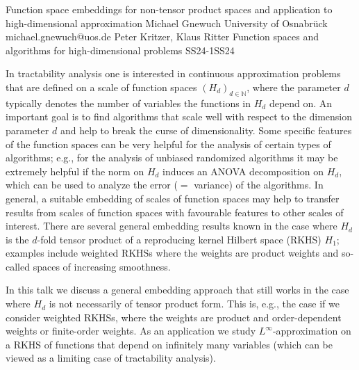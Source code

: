\begin{talk}
  {Function space embeddings for non-tensor product spaces and application to high-dimensional approximation}%
  {Michael Gnewuch}%
  {University of Osnabr\"uck}%
  {michael.gnewuch@uos.de}%
  {Peter Kritzer, Klaus Ritter}%
{Function spaces and algorithms for high-dimensional problems}
{}{SS24-1}{SS24}

			




In tractability analysis one is interested in continuous approximation problems
that are defined on a scale of function spaces $(H_d)_{d\in {\mathbb N}}$, where the parameter
$d$ typically denotes the number of variables the functions in $H_d$ depend on.
An important goal is to find algorithms that scale well with respect to the dimension parameter $d$ and help to break the curse of dimensionality. 
Some specific features of the function spaces can be very helpful for the analysis of certain types of algorithms; e.g., for the analysis of unbiased randomized algorithms it may be extremely helpful if the norm on $H_d$ induces an ANOVA decomposition on $H_d$, which can be used to analyze the error ($=$ variance) of the algorithms. 
In general, a suitable embedding of scales of function spaces may help to transfer results from scales of function spaces with favourable features to other scales of interest. There are several general embedding results known in the case where $H_d$ is the $d$-fold tensor product of a reproducing kernel Hilbert space (RKHS) 
$H_1$; examples include weighted RKHSs where the weights are product weights and so-called spaces of increasing smoothness.

In this talk we discuss a general embedding approach that still works in the case where $H_d$ is not necessarily of tensor product form. This is, e.g., the case if we consider weighted RKHSs, where the weights are product and order-dependent weights or finite-order weights. As an application we study $L^\infty$-approximation on a RKHS of functions that depend on infinitely many variables (which can be viewed as a limiting case of tractability analysis).




\end{talk}
